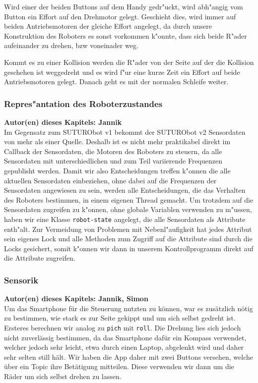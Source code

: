 \documentclass[8pt]{article}
\newcommand{\secauthor}[1]{\textbf{Autor(en) dieses Kapitels: {#1}}\\}
\begin{document}
Wird einer der beiden Buttons auf dem Handy gedr"uckt, wird abh"angig vom Button ein Effort auf den Drehmotor gelegt. Geschieht dies, wird immer auf beiden Antriebsmotoren der gleiche Effort angelegt, da durch unsere Konstruktion des Roboters es sonst vorkommen k"onnte, dass sich beide R"ader aufeinander zu drehen, bzw voneinader weg.
  
Kommt es zu einer Kollision werden die R"ader von der Seite auf der die Kollision geschehen ist weggedreht und es wird f"ur eine kurze Zeit ein Effort auf beide Antriebsmotoren gelegt. Danach geht es mit der normalen Schleife weiter. 

 
\subsubsection{Repres"antation des Roboterzustandes}
\secauthor{Jannik}
Im Gegensatz zum SUTURObot v1 bekommt der SUTURObot v2 Sensordaten von mehr als einer Quelle. Deshalb ist es nicht mehr praktikabel direkt im Callback der Sensordaten, die Motoren des Roboters zu steuern, da alle Sensordaten mit unterschiedlichen und zum Teil variierende Frequenzen gepublisht werden. Damit wir also Entscheidungen treffen k"onnen die alle aktuellen Sensordaten einbeziehen, ohne dabei auf die Frequenzen der Sensordaten angewiesen zu sein, werden alle Entscheidungen, die das Verhalten des Roboters bestimmen, in einem eigenen Thread gemacht. Um trotzdem auf die Sensordaten zugreifen zu k"onnen, ohne globale Variablen verwenden zu m"ussen, haben wir eine Klasse \texttt{robot-state} angelegt, die alle Sensordaten als Attribute enth"alt. Zur Vermeidung von Problemen mit Nebenl"aufigkeit hat jedes Attribut sein eigenes Lock und alle Methoden zum Zugriff auf die Attribute sind durch die Locks gesichert, somit k"onnen wir dann in unserem Kontrollprogramm direkt auf die Attribute zugreifen. 

\subsubsection{Sensorik} 
\secauthor{Jannik, Simon}
Um das Smartphone für die Steuerung nutzten zu können, war es zusätzlich nötig zu bestimmen, wie stark es zur Seite gekippt und um sich selbst gedreht ist. Ersteres berechnen wir analog zu \texttt{pich} mit \texttt{roll}. Die Drehung lies sich jedoch nicht zuverlässig bestimmen, da das Smartphone dafür ein Kompass verwendet, welcher jedoch sehr leicht, etwa durch einen Laptop, abgelenkt wird und daher sehr selten still hält. Wir haben die App daher mit zwei Buttons versehen, welche über ein Topic ihre Betätigung mitteilen. Diese verwenden wir dann um die Räder um sich selbst drehen zu lassen.
\end{document}
